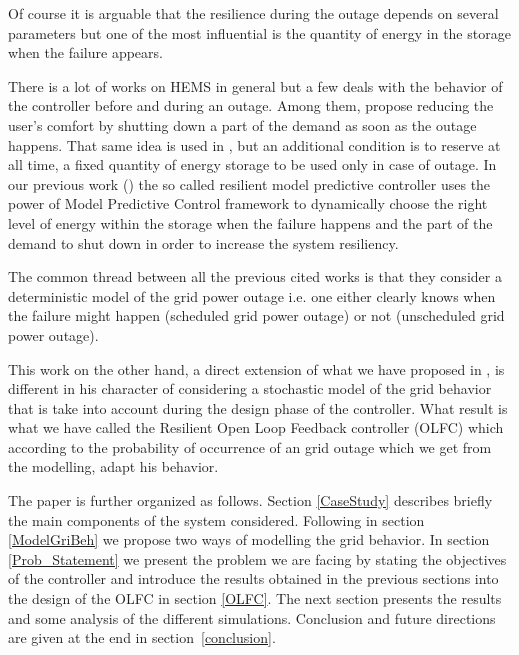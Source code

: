 \documentclass{ifacconf}
\begin{document}
Of course it is arguable that the resilience during the outage depends on several parameters but one of the most influential is the quantity of energy in the storage when the failure appears. 

There is a lot of works on HEMS in general but a few deals with the behavior of the controller before and during an outage. Among them, \cite{HGhRBo2015,RRoFBe2014} propose reducing the user's comfort by shutting down a part of the demand as soon as the outage happens. That same idea is used in \cite{JMaHJa2016}, but an additional condition is to reserve at all time, a fixed quantity of energy storage to be used only in case of outage. In our previous work (\cite{JPrPHa2019}) the so called resilient model predictive controller uses the power of Model Predictive Control framework to dynamically choose the right level of energy within the storage when the failure happens and the part of the demand to shut down in order to increase the system resiliency.

The common thread between all the previous cited works is that they consider a deterministic model of the grid power outage i.e. one either clearly knows when the failure might happen (scheduled grid power outage) or not (unscheduled grid power outage). 

This work on the other hand, a direct extension of what we have proposed in \cite{JPrPHa2019}, is different in his character of considering a stochastic model of the grid behavior that is take into account during the design phase of the controller. What result is what we have called the Resilient Open Loop Feedback controller (OLFC) which according to the probability of occurrence of an grid outage which we get from the modelling, adapt his behavior.

The paper is further organized as follows. Section \ref{CaseStudy} describes briefly the main components of the system considered. Following in section \ref{ModelGriBeh} we propose two ways of modelling the grid behavior. In section \ref{Prob_Statement} we present the problem we are facing by stating the objectives of the controller and introduce the results obtained in the previous sections into the design of the OLFC in section \ref{OLFC}. The next section presents the results and some analysis of the different simulations. Conclusion and future directions are given at the end in section~\ref{conclusion}.

\end{document}

